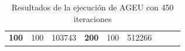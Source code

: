 \begin{table}[]
\begin{tabular}{|cccccclll}
\multicolumn{1}{|c|}{\multirow{-39}{*}{\cellcolor[HTML]{FFFFC7}\textbf{100}}} & \multicolumn{1}{c|}{\multirow{-9}{*}{\cellcolor[HTML]{DDFDFF}100}} & \multicolumn{1}{c|}{\cellcolor[HTML]{DAE8FC}103743}    & \multicolumn{1}{c|}{\multirow{-39}{*}{\cellcolor[HTML]{FFFFC7}\textbf{200}}} & \multicolumn{1}{c|}{\multirow{-10}{*}{\cellcolor[HTML]{DDFDFF}100}} & \multicolumn{1}{c|}{\cellcolor[HTML]{DDFDFF}512266}    &                                                                              &                                                                    &                                                        \\ \cline{1-6}
\end{tabular}
\caption{\label{AGEU450}Resultados de la ejecución de AGEU con 450 iteraciones}
\end{table}

